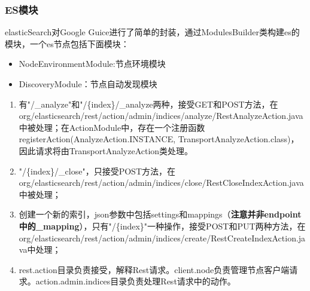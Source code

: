 \subsubsection{ES模块}
\par elasticSearch对Google Guice进行了简单的封装，通过ModulesBuilder类构建es的模块，一个es节点包括下面模块：
\begin{itemize}
\item NodeEnvironmentModule:节点环境模块
\item DiscoveryModule：节点自动发现模块
\end{itemize}
\begin{enumerate}[(1)]
\item 有"/\_analyze"和"/\{index\}/\_analyze两种，接受GET和POST方法，在org/elasticsearch/rest/action/admin/indices/analyze/RestAnalyzeAction.java中被处理；在ActionModule中，存在一个注册函数registerAction(AnalyzeAction.INSTANCE, TransportAnalyzeAction.class)，因此请求将由TransportAnalyzeAction类处理。
\item "/\{index\}/\_close"，只接受POST方法，在org/elasticsearch/rest/action/admin/indices/close/RestCloseIndexAction.java中被处理；
\item  创建一个新的索引，json参数中包括settings和mappings（\textbf{注意并非endpoint中的\_mapping}），只有"/\{index\}"一种操作，接受POST和PUT两种方法，在org/elasticsearch/rest/action/admin/indices/create/RestCreateIndexAction.java中处理；
\item rest.action目录负责接受，解释Rest请求。client.node负责管理节点客户端请求。action.admin.indices目录负责处理Rest请求中的动作。
\end{enumerate}
